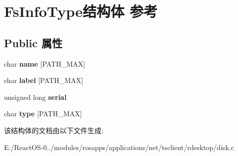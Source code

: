 \hypertarget{struct_fs_info_type}{}\section{Fs\+Info\+Type结构体 参考}
\label{struct_fs_info_type}
\subsection*{Public 属性}
\begin{DoxyCompactItemize}
\item 
\mbox{\label{struct_fs_info_type_a6c69174d7da00cab2ca1e99bd248cfbc}} 
char {\bfseries name} \mbox{[}P\+A\+T\+H\+\_\+\+M\+AX\mbox{]}
\item 
\mbox{\label{struct_fs_info_type_a0e7b9d14853bb695e4cf8c5b0a11c1d3}} 
char {\bfseries label} \mbox{[}P\+A\+T\+H\+\_\+\+M\+AX\mbox{]}
\item 
\mbox{\label{struct_fs_info_type_a3b86ffa56b6d951ced670b6d8a71ea5a}} 
unsigned long {\bfseries serial}
\item 
\mbox{\label{struct_fs_info_type_a984ca7ddbd4728f302b673e5be439c60}} 
char {\bfseries type} \mbox{[}P\+A\+T\+H\+\_\+\+M\+AX\mbox{]}
\end{DoxyCompactItemize}


该结构体的文档由以下文件生成\+:\begin{DoxyCompactItemize}
\item 
E\+:/\+React\+O\+S-\/0../modules/rosapps/applications/net/tsclient/rdesktop/disk.\+c\end{DoxyCompactItemize}
